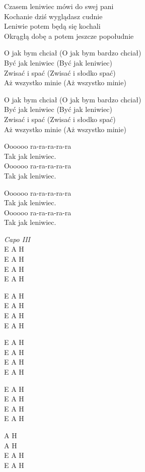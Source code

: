 \begin{text}
Czasem leniwiec mówi do swej pani\\
Kochanie dziś wyglądasz cudnie\\
Leniwie potem będą się kochali\\
Okrągłą dobę a potem jeszcze popołudnie

O jak bym chciał (O jak bym bardzo chciał)\\
Być jak leniwiec (Być jak leniwiec)\\
Zwisać i spać (Zwisać i słodko spać)\\
Aż wszystko minie (Aż wszystko minie)

O jak bym chciał (O jak bym bardzo chciał)\\
Być jak leniwiec (Być jak leniwiec)\\
Zwisać i spać (Zwisać i słodko spać)\\
Aż wszystko minie (Aż wszystko minie)

Oooooo ra-ra-ra-ra-ra\\
Tak jak leniwiec.\\
Oooooo ra-ra-ra-ra-ra\\
Tak jak leniwiec.

Oooooo ra-ra-ra-ra-ra\\
Tak jak leniwiec.\\
Oooooo ra-ra-ra-ra-ra\\
Tak jak leniwiec.
\end{text}
\begin{chord}
    \textit{Capo III}\\
E A H\\
E A H\\
E A H\\
E A H

E A H\\
E A H\\
E A H\\
E A H

E A H\\
E A H\\
E A H\\
E A H

E A H\\
E A H\\
E A H\\
E A H

    \hfill\break
    \hfill\break
    \hfill\break
    \hfill\break

    \hfill\break
    \hfill\break
    \hfill\break
    \hfill\break

    \hfill\break
    \hfill\break
    \hfill\break
    \hfill\break

    \hfill\break
    \hfill\break
    \hfill\break
    \hfill\break

    \hfill\break
    \hfill\break
    \hfill\break
    \hfill\break

A H\\
A H\\
E A H\\
E A H
\end{chord}
